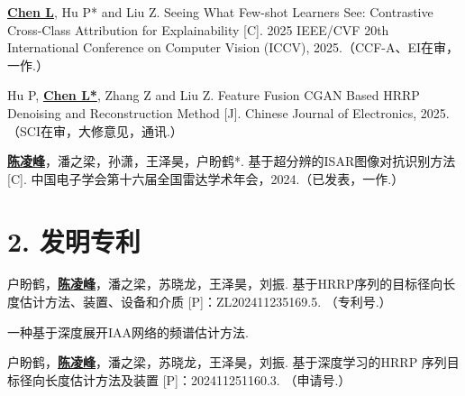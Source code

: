 \begin{resume}
\begin{enumerate}[label={[\arabic*]},itemsep=0pt,parsep=0pt,labelindent=26pt,labelwidth=*,leftmargin=0pt,itemindent=*,align=left]
  \item \textbf{\underline{Chen L}}, Hu P* and Liu Z. Seeing What Few-shot Learners See: Contrastive Cross-Class Attribution for Explainability [C]. 2025 IEEE/CVF 20th International Conference on Computer Vision (ICCV), 2025.（CCF-A、EI在审，一作.）
  \item 
  \item Hu P, \textbf{\underline{Chen L*}}, Zhang Z and Liu Z. Feature Fusion CGAN Based HRRP Denoising and Reconstruction Method [J]. Chinese Journal of Electronics, 2025. （SCI在审，大修意见，通讯.）
  \item \textbf{\underline{陈凌峰}}，潘之梁，孙潇，王泽昊，户盼鹤*. 基于超分辨的ISAR图像对抗识别方法 [C]. 中国电子学会第十六届全国雷达学术年会，2024.（已发表，一作.）
  \end{enumerate}

  \section*{2. 发明专利} %
  \begin{enumerate}[label={[\arabic*]},itemsep=0pt,parsep=0pt,labelindent=26pt,labelwidth=*,leftmargin=0pt,itemindent=*,align=left]
  \item 户盼鹤，\textbf{\underline{陈凌峰}}，潘之梁，苏晓龙，王泽昊，刘振. 基于HRRP序列的目标径向长度估计方法、装置、设备和介质 [P]：ZL202411235169.5. （专利号.）
  \item 
  \item 
  \item 
  \item 
  \item 一种基于深度展开IAA网络的频谱估计方法.
  \item 户盼鹤，\textbf{\underline{陈凌峰}}，潘之梁，苏晓龙，王泽昊，刘振. 基于深度学习的HRRP 序列目标径向长度估计方法及装置 [P]：202411251160.3. （申请号.）
  \end{enumerate}


\end{resume}
